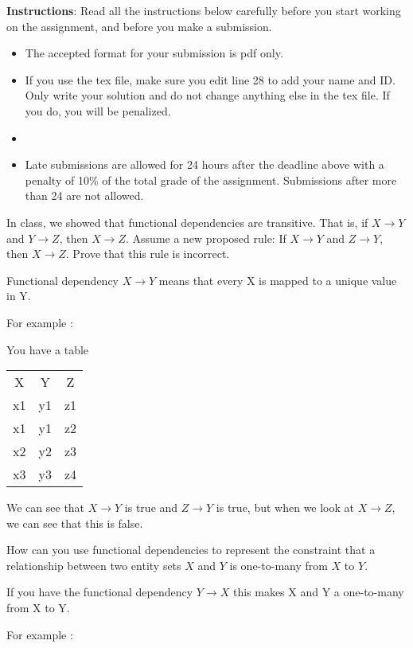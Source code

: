 \documentclass[a4 paper]{article}
\begin{document}
\textbf{Instructions}: Read all the instructions below carefully before you start working on the assignment, and before you make a submission.
\begin{itemize}
    \item The accepted format for your submission is pdf only.
    \item If you use the tex file, make sure you edit line 28 to add your name and ID. Only write your solution and do not change anything else in the tex file. If you do, you will be penalized.
    \item \item Late submissions are allowed for 24 hours after the deadline above with a penalty of 10\% of the total grade of the assignment. Submissions after more than 24 are not allowed.
\end{itemize}

In class, we showed that functional dependencies are transitive. That is, if $X \rightarrow Y$ and $Y \rightarrow Z$, then $X \rightarrow Z$. Assume a new proposed rule: If $X \rightarrow Y$ and $Z \rightarrow Y$, then $X \rightarrow Z$. Prove that this rule is incorrect.

Functional dependency $X \rightarrow Y$ means that every X is mapped to a unique value in Y.

For example :

You have a table 

\begin{tabular}{c c c}
    X & Y & Z \\
    x1 & y1 & z1 \\
    x1 & y1 & z2 \\
    x2 & y2 & z3 \\
    x3 & y3 & z4 \\
\end{tabular}

We can see that $X \rightarrow Y$ is true and $Z \rightarrow Y$ is true, but when we look at $X \rightarrow Z$, we can see that this is false.

How can you use functional dependencies to represent the constraint that a relationship between two entity sets $X$ and $Y$ is one-to-many from $X$ to $Y$.

If you have the functional dependency $Y \rightarrow X$ this makes X and Y a one-to-many from X to Y.

For example :
\end{document}
